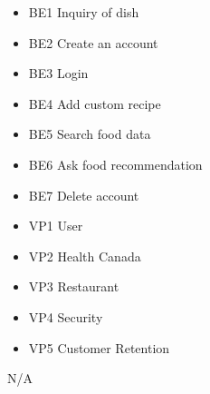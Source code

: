 \documentclass[]{article}
\begin{document}
\begin{itemize}
	\item BE1 Inquiry of dish
	\item BE2 Create an account
	\item BE3 Login
	\item BE4 Add custom recipe
	\item BE5 Search food data
	\item BE6 Ask food recommendation
	\item BE7 Delete account
\end{itemize}

\begin{itemize}
	\item VP1 User
	\item VP2 Health Canada
	\item VP3 Restaurant
	\item VP4 Security
	\item VP5 Customer Retention
\end{itemize}

 N/A \\
\end{document}
